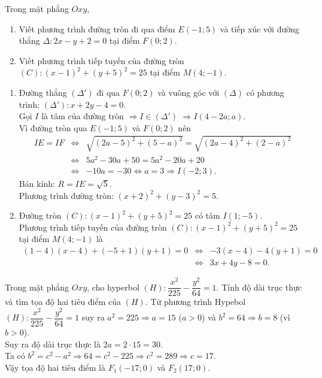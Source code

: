 \begin{bt}%
	Trong mặt phẳng $Oxy$,
	\begin{enumerate}
		\item Viết phương trình đường tròn đi qua điểm $E(-1;5)$ và tiếp xúc với đường thẳng $\Delta\colon 2x-y+2=0$ tại điểm $F(0;2)$.
		\item Viết phương trình tiếp tuyến của đường tròn $(C)\colon (x-1)^2+(y+5)^2=25$ tại điểm $M(4;-1)$.
	\end{enumerate}
	\loigiai
	{
		\begin{enumerate}
			\item Đường thẳng $\left(\Delta'\right)$ đi qua $F\left(0;2\right)$ và vuông góc với $\left(\Delta\right)$ có phương trình: $\left(\Delta'\right):x+2y-4=0$.\\
			Gọi $I$ là tâm của đường tròn $\Rightarrow I\in \left(\Delta'\right)$
			$\Rightarrow I\left(4-2a;a\right)$.\\
			Vì đường tròn qua $E\left(-1;5\right)$ và $F\left(0;2\right)$ nên
			\begin{eqnarray*}
				IE=IF&\Leftrightarrow& \sqrt{\left(2a-5\right)^2+\left(5-a\right)^2}=\sqrt{\left(2a-4\right)^2+\left(2-a\right)^2}\\
				&\Leftrightarrow& 5a^2-30a+50=5a^2-20a+20\\
				&\Leftrightarrow& -10a=-30\Leftrightarrow a=3\Rightarrow I\left(-2;3\right).
			\end{eqnarray*}
			Bán kính: $R=IE=\sqrt{5}$.\\
			Phương trình đường tròn: $\left(x+2\right)^2+\left(y-3\right)^2=5$.
			\item Đường tròn $\left(C\right):\left(x-1\right)^2+\left(y+5\right)^2=25$ có tâm $I\left(1;-5\right)$.\\
			Phương trình tiếp tuyến của đường tròn $\left(C\right)\colon\left(x-1\right)^2+\left(y+5\right)^2=25$ tại điểm $M\left(4;-1\right)$ là
			\begin{eqnarray*}
				\left(1-4\right)\left(x-4\right)+\left(-5+1\right)\left(y+1\right)=0&\Leftrightarrow& -3\left(x-4\right)-4\left(y+1\right)=0\\
				&\Leftrightarrow& 3x+4y-8=0.
			\end{eqnarray*}
		\end{enumerate}
	}
\end{bt}


\begin{bt}%
	Trong mặt phẳng $Oxy$, cho hyperbol $(H)\colon \dfrac{x^2}{225}-\dfrac{y^2}{64}=1$. Tính độ dài trục thực và tìm tọa độ hai tiêu điểm của $(H)$.
	\loigiai
	{
		Từ phương trình Hypebol $\left(H\right):\dfrac{x^2}{225}-\dfrac{y^2}{64}=1$ suy ra
		$a^2=225\Rightarrow a=15$ ($a>0$) và $b^2=64\Rightarrow b=8$ (vì $b>0$).\\
		Suy ra độ dài trục thực là $2a=2\cdot15=30$.\\
		Ta có $b^2=c^2-a^2\Rightarrow 64=c^2-225\Rightarrow c^2=289\Rightarrow c=17$.\\
		Vậy tọa độ hai tiêu điểm là $F_1\left(-17;0\right)$ và $F_2\left(17;0\right)$.
	}
\end{bt}

